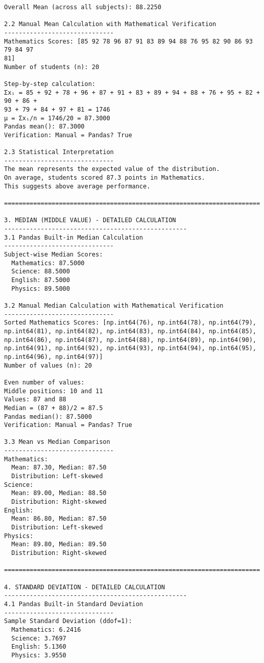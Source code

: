 \documentclass[11pt]{article}
\begin{document}
\begin{Verbatim}[commandchars=\\\{\}]
Overall Mean (across all subjects): 88.2250

2.2 Manual Mean Calculation with Mathematical Verification
------------------------------
Mathematics Scores: [85 92 78 96 87 91 83 89 94 88 76 95 82 90 86 93 79 84 97
81]
Number of students (n): 20

Step-by-step calculation:
Σxᵢ = 85 + 92 + 78 + 96 + 87 + 91 + 83 + 89 + 94 + 88 + 76 + 95 + 82 + 90 + 86 +
93 + 79 + 84 + 97 + 81 = 1746
μ = Σxᵢ/n = 1746/20 = 87.3000
Pandas mean(): 87.3000
Verification: Manual = Pandas? True

2.3 Statistical Interpretation
------------------------------
The mean represents the expected value of the distribution.
On average, students scored 87.3 points in Mathematics.
This suggests above average performance.

======================================================================

3. MEDIAN (MIDDLE VALUE) - DETAILED CALCULATION
--------------------------------------------------
3.1 Pandas Built-in Median Calculation
------------------------------
Subject-wise Median Scores:
  Mathematics: 87.5000
  Science: 88.5000
  English: 87.5000
  Physics: 89.5000

3.2 Manual Median Calculation with Mathematical Verification
------------------------------
Sorted Mathematics Scores: [np.int64(76), np.int64(78), np.int64(79),
np.int64(81), np.int64(82), np.int64(83), np.int64(84), np.int64(85),
np.int64(86), np.int64(87), np.int64(88), np.int64(89), np.int64(90),
np.int64(91), np.int64(92), np.int64(93), np.int64(94), np.int64(95),
np.int64(96), np.int64(97)]
Number of values (n): 20

Even number of values:
Middle positions: 10 and 11
Values: 87 and 88
Median = (87 + 88)/2 = 87.5
Pandas median(): 87.5000
Verification: Manual = Pandas? True

3.3 Mean vs Median Comparison
------------------------------
Mathematics:
  Mean: 87.30, Median: 87.50
  Distribution: Left-skewed
Science:
  Mean: 89.00, Median: 88.50
  Distribution: Right-skewed
English:
  Mean: 86.80, Median: 87.50
  Distribution: Left-skewed
Physics:
  Mean: 89.80, Median: 89.50
  Distribution: Right-skewed

======================================================================

4. STANDARD DEVIATION - DETAILED CALCULATION
--------------------------------------------------
4.1 Pandas Built-in Standard Deviation
------------------------------
Sample Standard Deviation (ddof=1):
  Mathematics: 6.2416
  Science: 3.7697
  English: 5.1360
  Physics: 3.9550


\end{Verbatim}
\end{document}
